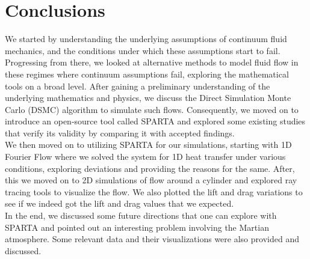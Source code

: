 \newpage

\chapter{Conclusions}

We started by understanding the underlying assumptions of continuum fluid mechanics, and the conditions under which these assumptions start to fail. Progressing from there, we looked at alternative methods to model fluid flow in these regimes where continuum assumptions fail, exploring the mathematical tools on a broad level. After gaining a preliminary understanding of the underlying mathematics and physics, we discuss the Direct Simulation Monte Carlo (DSMC) algorithm to simulate such flows. Consequently, we moved on to introduce an open-source tool called SPARTA and explored some existing studies that verify its validity by comparing it with accepted findings. \\

\no We then moved on to utilizing SPARTA for our simulations, starting with 1D Fourier Flow where we solved the system for 1D heat transfer under various conditions, exploring deviations and providing the reasons for the same. After, this we moved on to 2D simulations of flow around a cylinder and explored ray tracing tools to visualize the flow. We also plotted the lift and drag variations to see if we indeed got the lift and drag values that we expected. \\

\no In the end, we discussed some future directions that one can explore with SPARTA and pointed out an interesting problem involving the Martian atmosphere. Some relevant data and their visualizations were also provided and discussed.